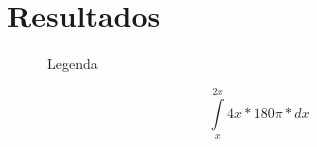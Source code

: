 \section{Resultados}

\lipsum[1]
\begin{center}
	\begin{figure}[h]
		\caption{Legenda}
		\label{fig:placeholder.jpg}
	\end{figure}
	\begin{equation}
	\int\limits_{x}^{2x} 4x*180\pi*dx
	\end{equation}
\end{center}